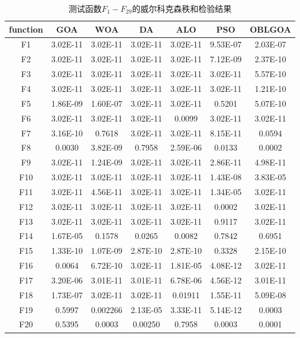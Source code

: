 \begin{table}[htbp]
    \centering
    \caption{测试函数$F_1-F_{29}$的威尔科克森秩和检验结果}\label{tab:results_wilcoxon_rank_sum_test_IGOA}
    \renewcommand\arraystretch{1.3} 


    \begin{tabular}{*{7}{c}}
    \hline
    function&GOA&WOA&DA&ALO&PSO&OBLGOA\\
    \hline
 
    {F1}& 3.02E-11&3.02E-11&3.02E-11&3.02E-11&9.53E-07&2.03E-07\\\hline
    {F2}& 3.02E-11&3.02E-11&3.02E-11&3.02E-11&7.12E-09&2.37E-10\\\hline
    {F3}& 3.02E-11&3.02E-11&3.02E-11&3.02E-11&3.02E-11&5.57E-10\\\hline
    {F4}& 3.02E-11&3.02E-11&3.02E-11&3.02E-11&3.02E-11&1.21E-10\\\hline
    {F5}& 1.86E-09&1.60E-07&3.02E-11&3.02E-11&0.5201&5.07E-10\\\hline
    {F6}& 3.02E-11&3.02E-11&3.02E-11&0.0099&3.02E-11&3.02E-11\\\hline
    {F7}& 3.16E-10&0.7618&3.02E-11&3.02E-11&8.15E-11&0.0594\\\hline
    {F8}& 0.0030&3.82E-09&0.7958&2.59E-06&0.0133&0.0002\\\hline
    {F9}& 3.02E-11&1.24E-09&3.02E-11&3.02E-11&2.86E-11&4.98E-11\\\hline
    {F10}& 3.02E-11&3.02E-11&3.02E-11&3.02E-11&1.43E-08&3.83E-05\\\hline
    {F11}& 3.02E-11&4.56E-11&3.02E-11&3.02E-11&1.34E-05&3.02E-11\\\hline
    {F12}& 3.02E-11&3.02E-11&3.02E-11&3.02E-11&0.0002&3.02E-11\\\hline
    {F13}& 3.02E-11&3.02E-11&3.02E-11&3.02E-11&0.9117&3.02E-11\\\hline
    {F14}& 1.67E-05&0.1578&0.0265&0.0082&0.7842&0.6951\\\hline
    {F15}& 1.33E-10&1.07E-09&2.87E-10&2.87E-10&0.3328&2.15E-10\\\hline
    {F16}& 0.0064&6.72E-10&3.02E-11&1.81E-05&4.08E-12&3.02E-11\\\hline
    {F17}& 3.20E-06&3.01E-11&3.01E-11&6.78E-06&4.56E-12&3.01E-11\\\hline
    {F18}& 1.73E-07&3.02E-11&3.02E-11&0.01911&1.55E-11&5.09E-08\\\hline
    {F19}& 0.5997&0.002266&2.13E-05&3.33E-11&5.14E-12&0.0003\\\hline
    {F20}& 0.5395&0.0003&0.00250&0.7958&0.0003&0.0001\\\hline
    \end{tabular}
\end{table}
